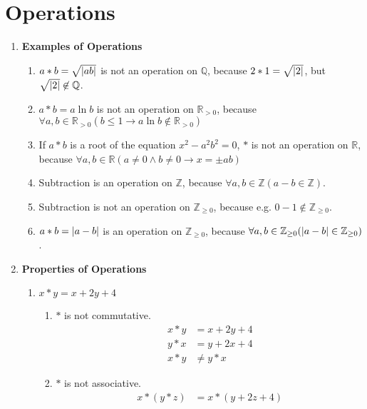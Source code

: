 \chapter{Operations}
\label{ch:operations}

\begin{enumerate}[label={\Alph*.},font={\bfseries}]
\item {\bf Examples of Operations}
  \begin{enumerate}[label={\arabic*},font={\bfseries}]
  \item $a * b = \sqrt{\lvert ab\rvert}$ is not an operation on $\mathbb{Q}$, because
    $2 * 1 = \sqrt{\lvert2\rvert}$, but $\sqrt{\lvert2\rvert} \not\in \mathbb{Q}$.
  \item $a * b = a \ln b$ is not an operation on $\mathbb{R}_{>0}$, because
    $\forall a,b\in\mathbb{R}_{>0} (b \le 1 \to a \ln b \not\in \mathbb{R}_{>0})$
  \item If $a * b$ is a root of the equation $x^2 - a^2b^2=0$,
    $*$ is not an operation on $\mathbb{R}$, because
    $\forall a,b \in \mathbb{R} (a \ne 0 \land b \ne 0 \to x = \pm ab)$
  \item Subtraction is an operation on $\mathbb{Z}$, because
    $\forall a,b \in \mathbb{Z} (a-b \in \mathbb{Z})$.
  \item Subtraction is not an operation on $\mathbb{Z}_{\ge 0}$, because
    e.g. $0-1 \not\in \mathbb{Z}_{\ge 0}$.
  \item $a * b = \lvert a-b\rvert$ is an operation on $\mathbb{Z}_{\ge 0}$,
    because $\forall a,b \in \mathbb{Z}_{\ge 0} (\lvert a-b\rvert \in
    \mathbb{Z}_{\ge 0})$.
  \end{enumerate}
\item {\bf Properties of Operations}
  \begin{enumerate}[label={\arabic*},font={\bfseries}]
  \item $x*y=x+2y+4$
    \begin{enumerate}[label={(\roman*)}]
    \item $*$ is not commutative.
      \begin{align*}
        x*y &= x+2y+4 \\
        y*x &= y+2x+4 \\
        x*y &\neq y*x
      \end{align*}
    \item $*$ is not associative.
      \begin{align*}
        x*(y*z) &= x*(y+2z+4) \\

\end{align*}
\end{enumerate}
\end{enumerate}
\end{enumerate}
